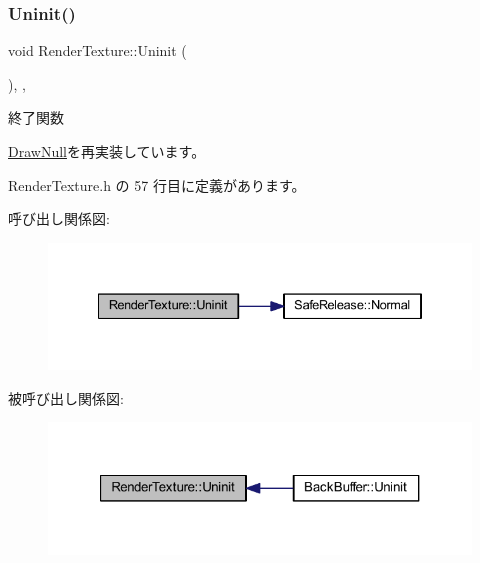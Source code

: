 \subsubsection{\texorpdfstring{Uninit()}{Uninit()}}
{\footnotesize\ttfamily void Render\+Texture\+::\+Uninit (\begin{DoxyParamCaption}{ }\end{DoxyParamCaption})\hspace{0.3cm}{\ttfamily [inline]}, {\ttfamily [override]}, {\ttfamily [virtual]}}



終了関数 



\mbox{\hyperlink{class_draw_null_a12d44e341c7364b5ab9cdd661dc16187}{Draw\+Null}}を再実装しています。



 Render\+Texture.\+h の 57 行目に定義があります。

呼び出し関係図\+:
\nopagebreak
\begin{figure}[H]
\begin{center}
\leavevmode
\includegraphics[width=334pt]{class_render_texture_a0e55cd9b412d87dfe1f4b90f29f357c8_cgraph}
\end{center}
\end{figure}
被呼び出し関係図\+:
\nopagebreak
\begin{figure}[H]
\begin{center}
\leavevmode
\includegraphics[width=321pt]{class_render_texture_a0e55cd9b412d87dfe1f4b90f29f357c8_icgraph}
\end{center}
\end{figure}
\mbox{\label{class_render_texture_ac27f8cfac7903dd502de61e22abfc457}} 
